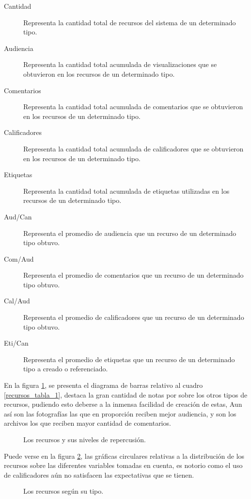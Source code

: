 \begin{description}
\item [Cantidad] Representa la cantidad total de recursos del sistema de un
determinado tipo.
\item [Audiencia] Representa la cantidad total acumulada de visualizaciones que
se obtuvieron en los recursos de un determinado tipo.
\item [Comentarios] Representa la cantidad total acumulada de comentarios que
se obtuvieron en los recursos de un determinado tipo.
\item [Calificadores] Representa la cantidad total acumulada de calificadores
que se obtuvieron en los recursos de un determinado tipo.
\item [Etiquetas] Representa la cantidad total acumulada de etiquetas utilizadas
en los recursos de un determinado tipo.
\item [Aud/Can] Representa el promedio de audiencia que un recurso de un
determinado tipo obtuvo.
\item [Com/Aud] Representa el promedio de comentarios que un recurso de un
determinado tipo obtuvo.
\item [Cal/Aud] Representa el promedio de calificadores que un recurso de un
determinado tipo obtuvo.
\item [Eti/Can] Representa el promedio de etiquetas que un recurso de un
determinado tipo a creado o referenciado.
\end{description}

En la figura \ref{recursos_bars_1}, se presenta el diagrama de barras relativo
al cuadro \ref{recursos_tabla_1}, destaca la gran cantidad de notas por sobre
los otros tipos de recursos, pudiendo esto deberse a la inmensa facilidad de
creación de estas, Aun así son las fotografías las que en proporción reciben
mejor audiencia, y son los archivos los que reciben mayor cantidad de 
comentarios.

\begin{figure}
\centering

\caption{Los recursos y sus niveles de repercusión.}
\label{recursos_bars_1}
\end{figure}

Puede verse en la figura \ref{recursos_pie_1}, las gráficas circulares relativas
a la distribución de los recursos sobre las diferentes variables tomadas en
cuenta, es notorio como el uso de calificadores aún no satisfacen las
expectativas que se tienen.

\begin{figure}
\centering

\caption{Los recursos según su tipo.}
\label{recursos_pie_1}
\end{figure}

